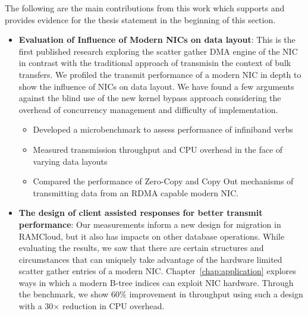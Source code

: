 The following are the main contributions from this work which supports and provides
evidence for the thesis statement in the beginning of this section.

\begin{itemize}

  \item{\textbf{Evaluation of Influence of Modern NICs on data layout}}: This is the first published research exploring the scatter gather DMA engine of the NIC in contrast with the traditional approach of transmisin the context of bulk transfers. 
   We profiled the transmit performance of a modern NIC in depth to show the influence of NICs on data layout. 
   We have found a few arguments against the blind use of the new kernel bypass approach considering
   the overhead of concurrency management and difficulty of implementation.
   \begin{itemize}

    \item Developed a microbenchmark to assess performance of infiniband verbs

    \item Measured transmission throughput and CPU overhead in the face of varying
    data layouts

    \item Compared the performance of Zero-Copy and Copy Out mechanisms of 
    transmitting data from an RDMA capable modern NIC.
   \end{itemize} 

    \item{\textbf{The design of client assisted responses for better transmit performance}}: Our measurements inform a new design for migration in RAMCloud, but it also has impacts on other database operations.
     While evaluating the results, we saw that there are certain structures and circumstances that can uniquely take advantage of the hardware limited scatter gather entries of a modern NIC.
     Chapter~\ref{chap:application} explores ways in which a modern B-tree indices can exploit NIC hardware.
     Through the benchmark, we show 60\% improvement in throughput using such a design with a 30$\times$ reduction in CPU overhead.



\end{itemize}
